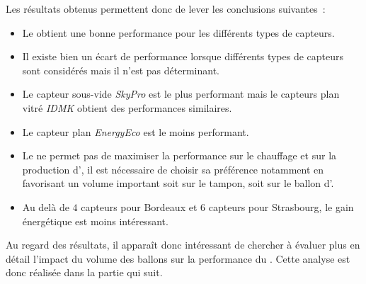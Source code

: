 Les résultats obtenus permettent donc de lever les conclusions suivantes~:
\begin{itemize}
    \item Le  obtient une bonne performance pour les différents types de
          capteurs.
    \item Il existe bien un écart de performance lorsque différents types de capteurs
          sont considérés mais il n’est pas déterminant.
    \item Le capteur sous-vide \textit{SkyPro} est le plus performant mais le capteurs
          plan vitré \textit{IDMK} obtient des performances similaires.
    \item Le capteur plan \textit{EnergyEco} est le moins performant.
    \item Le  ne permet pas de maximiser la performance sur le chauffage
          et sur la production d’, il est nécessaire de choisir sa préférence
          notamment en favorisant un volume important soit sur le tampon, soit sur le
          ballon d’.
    \item Au delà de $4$ capteurs pour Bordeaux et $6$ capteurs pour Strasbourg,
          le gain énergétique est moins intéressant.
\end{itemize}

Au regard des résultats, il apparaît donc intéressant de chercher à évaluer plus en détail
l’impact du volume des ballons sur la performance du . Cette analyse est donc
réalisée dans la partie qui suit.


